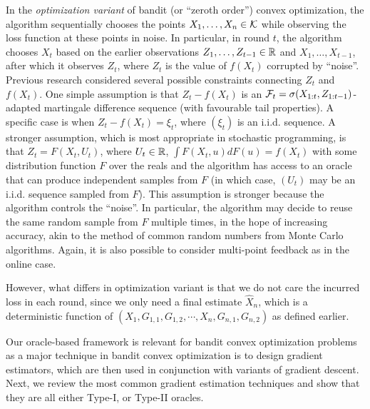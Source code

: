 In the \emph{optimization variant} of bandit (or ``zeroth order'') convex optimization, 
the algorithm sequentially chooses the points $X_1,\dots,X_n\in \mathcal{K}$ while observing the loss function at these points in noise.
In particular, in round $t$, the algorithm chooses $X_t$ based on the earlier observations $Z_1,\dots,Z_{t-1}\in \mathbb{R}$ and $X_1,\dots,X_{t-1}$, after which it observes $Z_t$, where $Z_t$ is the value of $f(X_t)$ corrupted by ``noise''.
Previous research considered several possible constraints connecting $Z_t$ and $f(X_t)$.
One simple assumption is that $Z_t-f(X_t)$ is an $\mathcal{F}_t = \sigma(X_{1:t},Z_{1:t-1})$-adapted martingale difference sequence (with favourable tail properties). 
A specific case is when $Z_t - f(X_t) = \xi_t$, where $(\xi_t)$ is an i.i.d. sequence.
A stronger assumption, which is most appropriate in stochastic programming, 
is that $Z_t = F(X_t,U_t)$, where $U_t\in \mathbb{R}$, $\int F(X_t,u) dF(u) = f(X_t)$ with some distribution function $F$ over the reals and the algorithm has access to an oracle that can produce independent samples from $F$ (in which case, $(U_t)$ may be an i.i.d. sequence sampled from $F$).
This assumption is stronger because the algorithm controls the ``noise''. 
In particular, the algorithm may decide to reuse the same random sample from $F$ multiple times, 
in the hope of increasing accuracy, akin to the method of common random numbers from Monte Carlo algorithms.
Again, it is also possible to consider multi-point feedback as in the online case.

However, what differs in optimization variant is that we do not care the incurred loss in each round, since we only need a final estimate $\hat{X}_n$, which is a deterministic function of $\left( X_1, G_{1,1}, G_{1,2}, \cdots, X_{n},G_{n,1}, G_{n,2}  \right)$ as defined earlier.


Our oracle-based framework is relevant for bandit convex optimization problems as a major technique in bandit convex
optimization is to design gradient estimators, which are then used in conjunction with variants of gradient descent. 
Next, we review the most common gradient estimation techniques and show that they are all either Type-I, or Type-II oracles.


